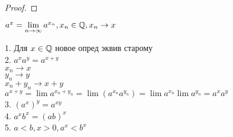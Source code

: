 \begin{definition}
\begin{theorem}
\begin{proof}
	\end{proof}
\end{theorem}
\begin{definition}
$ a^x = \lim\limits_{n \rightarrow \infty} a^{x_n}, x_n \in \mathbb{Q}, x_n \rightarrow x $
\end{definition}
\begin{properties}
	1. Для $ x \in \mathbb{Q} $ новое опред эквив старому \\
	2. $ a^xa^y= a^{x+y} $\\
	$ x_n \rightarrow x $ \\
	$ y_n \rightarrow y $ \\
	$ x_n + y_n \rightarrow x+y $ \\
	$ a^{x+y} = \lim a^{x_n+y_n} = \lim (a^{x_n} a^{y_n}) = \lim a^{x_n} \lim a^{y_n} = a^xa^y $ \\
	3. $ (a^x)^y = a^{xy} $ \\
	4. $ a^x b^x = (ab)^x $ \\
	5. $ a < b, x > 0, a^x < b^x $ 
 	
\end{properties}




\end{definition}

